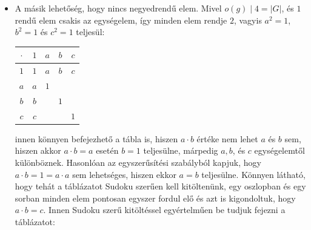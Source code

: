\documentclass[12pt]{book}
\theoremstyle{plain} %
\theoremstyle{definition} %
\theoremstyle{remark}
\numberwithin{equation}{section}  %
\begin{document}
\begin{itemize}
{\begin{itemize}
{\begin{center}
\begin{tabular}{ | c || c | c | c | c | }
							\hline
							$\cdot$ & $1$ & $a$ & $b$ & $c$ \\
							\hline
							\hline
							$1$ & $1$ & $g$ & $g^2$ & $g^3$ \\
							\hline
							$a$ & $g$ & $g^2$ & $g^3$ & $1$ \\
							\hline
							$b$ & $g^2$ & $g^3$ & $1$ & $g$ \\
							\hline
							$c$ & $g^3$ & $1$ & $g$ & $g^2$ \\   
							\hline 
						\end{tabular}
					\end{center}
					módon fejezhető be.
				}
				\item {
					A másik lehetőség, hogy nincs negyedrendű elem. Mivel $o(g) \mid 4 = |G|$, és $1$ rendű elem csakis az egységelem, így minden elem rendje $2$, vagyis $a^2=1$, $b^2=1$ és $c^2=1$ teljesül:
					\begin{center}
						\setlength{\tabcolsep}{0.7em} %
						\renewcommand{\arraystretch}{1.5}
						\begin{tabular}{ | c || c | c | c | c | }
							\hline
							$\cdot$ & $1$ & $a$ & $b$ & $c$ \\
							\hline
							\hline
							$1$ & $1$ & $a$ & $b$ & $c$ \\
							\hline
							$a$ & $a$ & $1$ & & \\
							\hline
							$b$ & $b$ & & $1$ & \\
							\hline
							$c$ & $c$ & & & $1$ \\   
							\hline 
						\end{tabular}
					\end{center}
					innen könnyen befejezhető a tábla is, hiszen $a\cdot b$ értéke nem lehet $a$ és $b$ sem, hiszen akkor $a\cdot b = a$ esetén $b=1$ teljesülne, márpedig $a, b$, és $c$ egységelemtől különböznek. Hasonlóan az egyszerűsítési szabályból kapjuk, hogy $a\cdot b = 1 = a\cdot a$ sem lehetséges, hiszen ekkor $a=b$ teljesülne. Könnyen látható, hogy tehát a táblázatot Sudoku szerűen kell kitöltenünk, egy oszlopban és egy sorban minden elem pontosan egyszer fordul elő és azt is kigondoltuk, hogy $a\cdot b = c$. Innen Sudoku szerű kitöltéssel egyértelműen be tudjuk fejezni a táblázatot:
					\begin{center}
						\setlength{\tabcolsep}{0.7em} %
						\renewcommand{\arraystretch}{1.5}
						\begin{tabular}{ | c || c | c | c | c | }
							\hline

\end{tabular}
\end{center}}
\end{itemize}}
\end{itemize}
\end{document}
